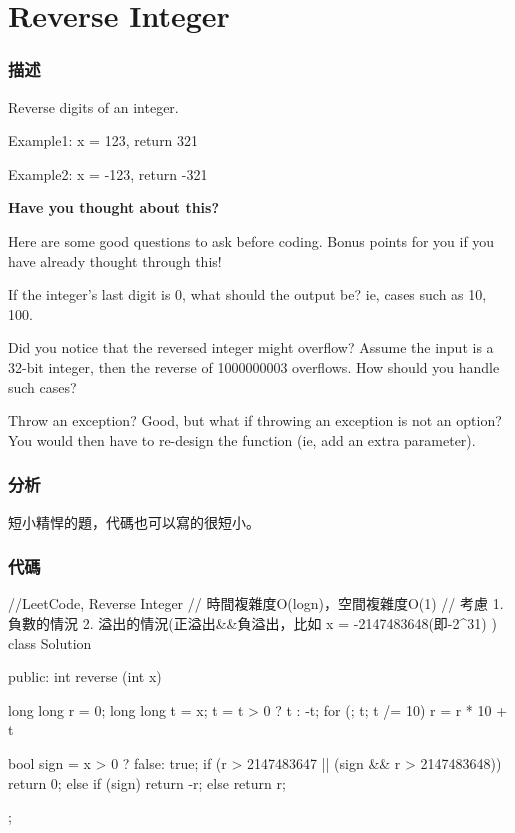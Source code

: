 \section{Reverse Integer} %
\label{sec:reverse-integer}


\subsubsection{描述}
Reverse digits of an integer.

Example1: x = 123, return 321

Example2: x = -123, return -321


\textbf{Have you thought about this?}

Here are some good questions to ask before coding. Bonus points for you if you have already thought through this!

If the integer's last digit is 0, what should the output be? ie, cases such as 10, 100.

Did you notice that the reversed integer might overflow? Assume the input is a 32-bit integer, then the reverse of 1000000003 overflows. How should you handle such cases?

Throw an exception? Good, but what if throwing an exception is not an option? You would then have to re-design the function (ie, add an extra parameter).


\subsubsection{分析}
短小精悍的題，代碼也可以寫的很短小。


\subsubsection{代碼}
\begin{Code}
//LeetCode, Reverse Integer
// 時間複雜度O(logn)，空間複雜度O(1)
// 考慮 1.負數的情況 2. 溢出的情況(正溢出&&負溢出，比如 x = -2147483648(即-2^31) )
class Solution {
public:
    int reverse (int x) {
        long long r = 0;
        long long t = x;
        t = t > 0 ? t : -t;
        for (; t; t /= 10)
            r = r * 10 + t %

        bool sign = x > 0 ? false: true;
        if (r > 2147483647 || (sign && r > 2147483648)) {
            return 0;
        } else {
            if (sign) {
                return -r;
            } else {
                return r;
            }
        }
    }
};
\end{Code}


